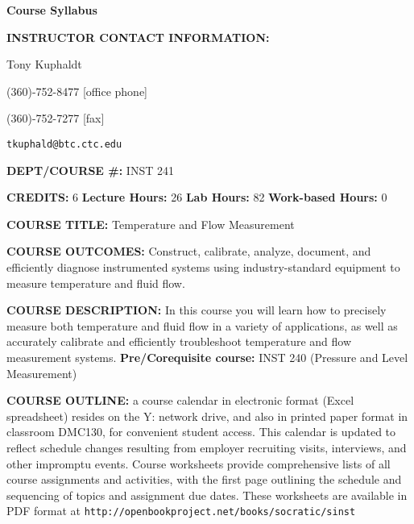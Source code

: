 


\centerline{\bf Course Syllabus} \bigskip 
 
\noindent
{\bf INSTRUCTOR CONTACT INFORMATION:}

Tony Kuphaldt

(360)-752-8477 [office phone]

(360)-752-7277 [fax]

{\tt tkuphald@btc.ctc.edu}

\vskip 10pt

\noindent
{\bf DEPT/COURSE \#:} INST 241

\vskip 10pt

\noindent
{\bf CREDITS:} 6 \hskip 30pt {\bf Lecture Hours:} 26 \hskip 30pt {\bf Lab Hours:} 82 \hskip 30pt {\bf Work-based Hours:} 0

\vskip 10pt

\noindent
{\bf COURSE TITLE:} Temperature and Flow Measurement

\vskip 10pt

\noindent
{\bf COURSE OUTCOMES:} Construct, calibrate, analyze, document, and efficiently diagnose instrumented systems using industry-standard equipment to measure temperature and fluid flow.

\vskip 10pt

\noindent
{\bf COURSE DESCRIPTION:} In this course you will learn how to precisely measure both temperature and fluid flow in a variety of applications, as well as accurately calibrate and efficiently troubleshoot temperature and flow measurement systems.   {\bf Pre/Corequisite course:} INST 240 (Pressure and Level Measurement)

\vskip 10pt

\noindent
{\bf COURSE OUTLINE:} a course calendar in electronic format (Excel spreadsheet) resides on the Y: network drive, and also in printed paper format in classroom DMC130, for convenient student access.  This calendar is updated to reflect schedule changes resulting from employer recruiting visits, interviews, and other impromptu events.  Course worksheets provide comprehensive lists of all course assignments and activities, with the first page outlining the schedule and sequencing of topics and assignment due dates.  These worksheets are available in PDF format at {\tt http://openbookproject.net/books/socratic/sinst}

